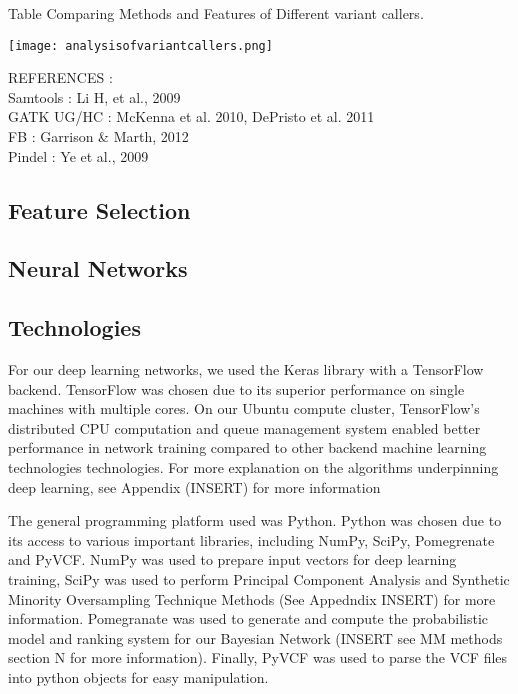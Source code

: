 \documentclass{article}
\begin{document}
\begin{table}[h]
\caption{Table Comparing Methods and Features of Different variant callers.}
\texttt{[image: analysisofvariantcallers.png]}
\centering
\end{table}

REFERENCES : \\
Samtools : Li H, et al., 2009\\
GATK UG/HC : McKenna et al. 2010, DePristo et al. 2011\\
FB : Garrison \& Marth, 2012\\
Pindel : Ye et al., 2009\\

\subsection{Feature Selection}

\subsection{Neural Networks}



\subsection{Technologies}
For our deep learning networks, we used the Keras library with a TensorFlow backend. TensorFlow was chosen due to its superior performance on single machines with multiple cores. On our Ubuntu compute cluster, TensorFlow's distributed CPU computation and queue management system enabled better performance in network training compared to other backend machine learning technologies technologies. For more explanation on the algorithms underpinning deep learning, see Appendix (INSERT) for more information 

The general programming platform used was Python. Python was chosen due to its access to various important libraries, including NumPy, SciPy, Pomegrenate and PyVCF. NumPy was used to prepare input vectors for deep learning training, SciPy was used to perform Principal Component Analysis and Synthetic Minority Oversampling Technique Methods (See Appedndix INSERT) for more information. Pomegranate was used to generate and compute the probabilistic model and ranking system for our Bayesian Network (INSERT see MM methods section N for more information). Finally, PyVCF was used to parse the VCF files into python objects for easy manipulation.
\end{document}
